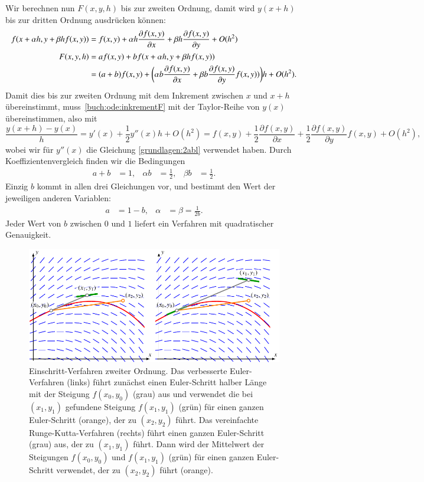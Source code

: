 Wir berechnen nun $F(x,y,h)$ bis zur zweiten Ordnung, damit wird 
$y(x+h)$ bis zur dritten Ordnung ausdrücken können:
\begin{align}
f(x+\alpha h, y + \beta h f(x,y))
&=
f(x,y)+\alpha h\frac{\partial f(x,y)}{\partial x}
+ \beta h \frac{\partial f(x,y)}{\partial y} + O(h^2)
\notag
\\
F(x,y,h)
&=
af(x,y) + bf(x+\alpha h, y + \beta h f(x,y))
\notag
\\
&=
(a+b)f(x,y) + \biggl(\alpha b\frac{\partial f(x,y)}{\partial x}
+ \beta b\frac{\partial f(x,y)}{\partial y} f(x,y))\biggr)h+O(h^2).
\label{buch:ode:inkrementF}
\end{align}
Damit dies bis zur zweiten Ordnung mit dem Inkrement zwischen $x$ und $x+h$
übereinstimmt, muss~\eqref{buch:ode:inkrementF} mit der Taylor-Reihe
von $y(x)$ übereinstimmen, also mit
\begin{equation}
\frac{y(x+h)-y(x)}{h}=y'(x) + \frac12y''(x)h + O(h^2)
=f(x,y) + \frac12\frac{\partial f(x,y)}{\partial x}
+\frac12\frac{\partial f(x,y)}{\partial y}f(x,y) + O(h^2),
\label{buch:ode:ytaylor}
\end{equation}
wobei wir für $y''(x)$ die Gleichung \eqref{grundlagen:2abl} verwendet haben.
Durch Koeffizientenvergleich finden wir die Bedingungen
\[
\begin{aligned}
a+b&=1,&
\alpha b&=\frac12,&
\beta b&=\frac12.
\end{aligned}
\]
Einzig $b$ kommt in allen drei Gleichungen vor, und bestimmt den Wert der
jeweiligen anderen Variablen:
\[
\begin{aligned}
a&=1-b,&\alpha&= \beta=\frac{1}{2b}.
\end{aligned}
\]
Jeder Wert von $b$ zwischen $0$ und $1$ liefert ein Verfahren mit quadratischer
Genauigkeit.

\begin{figure}
\centering
\includegraphics{chapters/50-ode/figures/ordnung2.pdf}
\caption{Einschritt-Verfahren zweiter Ordnung.
Das verbesserte Euler-Verfahren (links) führt zunächst einen Euler-Schritt
halber Länge mit der Steigung $f(x_0,y_0)$ (grau) aus und verwendet
die bei $(x_1,y_1)$ gefundene Steigung 
$f(x_1,y_1)$ (grün) für einen ganzen Euler-Schritt (orange),
der zu $(x_2,y_2)$ führt.
Das vereinfachte Runge-Kutta-Verfahren (rechts) führt einen ganzen
Euler-Schritt (grau) aus, der zu $(x_1,y_1)$ führt.
Dann wird der Mittelwert der Steigungen $f(x_0,y_0)$ und $f(x_1,y_1)$
(grün) für einen ganzen Euler-Schritt verwendet, der zu $(x_2,y_2)$ führt
(orange).
\label{buch:einschritt:figure:ordnung2}}
\end{figure}

